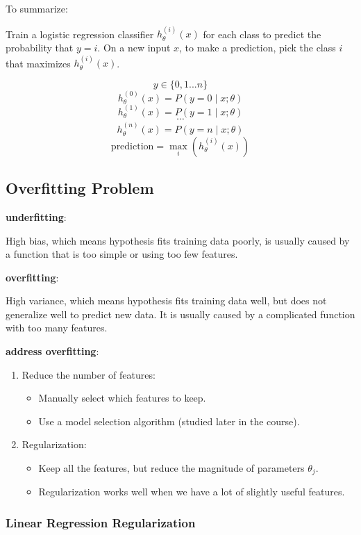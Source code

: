 \documentclass{article}
\begin{document}
To summarize: 

Train a logistic regression classifier \(h_{\theta}^{(i)}(x)\) for each class to predict the probability that \(y = i\). On a new input \(x\), to make a prediction, pick the class \(i\) that maximizes \(h_{\theta} ^{(i)}(x)\).

\[y \in \{0, 1 ... n\}\] 
\[h_{\theta}^{(0)}(x) = P(y = 0 \mid x ; \theta)\]
\[h_{\theta}^{(1)}(x) = P(y = 1 \mid x ; \theta)\]
\[\cdots\]
\[h_{\theta}^{(n)}(x) = P(y = n \mid x ; \theta)\] 
\[\text{prediction} = \max_i(h_{\theta}^{(i)}(x))\]

\subsection{Overfitting Problem}

\textbf{underfitting}:

High bias, which means hypothesis fits training data poorly, is usually caused by a function that is too simple or using too few features. 

\textbf{overfitting}:

High variance, which means hypothesis fits training data well, but does not generalize well to predict new data. It is usually caused by a complicated function with too many features.

\textbf{address overfitting}:

\begin{enumerate}
\item Reduce the number of features:
\begin{itemize}
\item Manually select which features to keep.
\item Use a model selection algorithm (studied later in the course).
\end{itemize}
\item Regularization:
\begin{itemize}
\item Keep all the features, but reduce the magnitude of parameters \(\theta_j\).
\item Regularization works well when we have a lot of slightly useful features.
\end{itemize}
\end{enumerate}

\subsubsection{Linear Regression Regularization}
\end{document}
